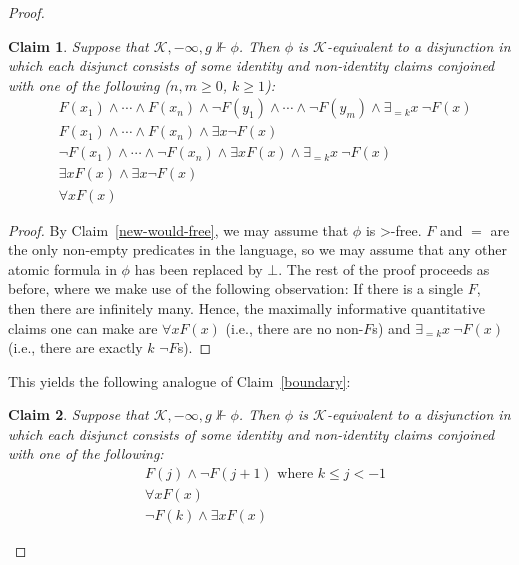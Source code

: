 \documentclass[12pt]{article}
\newtheorem{claim}{Claim}
\newcommand{\would}{\mathbin{>}}
\begin{document}
\begin{proof}
\begin{claim}\label{new-into-dnf}
    Suppose that $\mathcal{K},-\infty,g \nVdash \phi$. 
    Then $\phi$ is $\mathcal{K}$-equivalent to a disjunction in which each disjunct consists of some identity and non-identity claims conjoined with one of the following ($n,m \geq 0$, $k \geq 1$):
    \begin{align*}
        & F(x_1) \wedge \cdots \wedge F(x_n) \wedge \neg F(y_1) \wedge \cdots \wedge \neg F(y_m) \wedge \exists_{=k} x \ \neg F(x)\\
        & F(x_1) \wedge \cdots \wedge F(x_n) \wedge \exists x \neg F(x) \\
        & \neg F(x_1) \wedge \cdots \wedge \neg F(x_n) \wedge \exists x F(x) \wedge \exists_{=k} x \ \neg F(x)\\
        & \exists x F(x) \wedge \exists x \neg F(x) \\
        & \forall x F(x)
    \end{align*}
\end{claim}

\begin{proof}
    By Claim~\ref{new-would-free}, we may assume that $\phi$ is $\would$-free. 
    $F$ and $=$ are the only non-empty predicates in the language, so we may assume that any other atomic formula in $\phi$ has been replaced by $\bot$. 
    The rest of the proof proceeds as before, where we make use of the following observation: 
    If there is a single $F$, then there are infinitely many. 
    Hence, the maximally informative quantitative claims one can make are $\forall x F(x)$ (i.e., there are no non-$F$s) and $\exists_{=k} x \ \neg F(x)$ (i.e., there are exactly $k$ $\neg F$s).
\end{proof}

This yields the following analogue of Claim~\ref{boundary}:

\begin{claim}\label{new-boundary}
    Suppose that $\mathcal{K},-\infty,g \nVdash \phi$. 
    Then $\phi$ is $\mathcal{K}$-equivalent to a disjunction in which each disjunct consists of some identity and non-identity claims conjoined with one of the following:
    \begin{align*}
        & F(j) \wedge \neg F(j+1) \text{ where } k \leq j <-1 \\
        & \forall x F(x) \\
        & \neg F(k) \wedge \exists x F(x)
    \end{align*}
\end{claim}


\end{proof}
\end{document}
